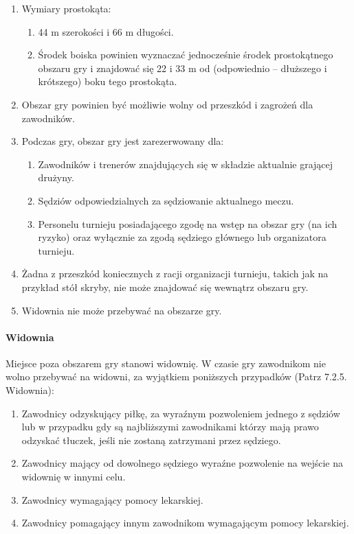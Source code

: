 \documentclass[12pt]{article}
\begin{document}
\begin{enumerate}
	\item Wymiary prostokąta:
	      \begin{enumerate}
		      \item 44 m szerokości i 66 m długości.
		      \item Środek boiska powinien wyznaczać jednocześnie środek prostokątnego
		            obszaru gry i znajdować się 22 i 33 m od (odpowiednio -- dłuższego i
		            krótszego) boku tego prostokąta.
	      \end{enumerate}

	\item Obszar gry powinien być możliwie wolny od przeszkód i zagrożeń dla
	      zawodników.

	\item Podczas gry, obszar gry jest zarezerwowany dla:
	      \begin{enumerate}
		      \item Zawodników i trenerów znajdujących się w składzie aktualnie grającej
		            drużyny.
		      \item Sędziów odpowiedzialnych za sędziowanie aktualnego meczu.
		      \item Personelu turnieju posiadającego zgodę na wstęp na obszar gry (na
		            ich ryzyko) oraz wyłącznie za zgodą sędziego głównego lub
		            organizatora turnieju.
	      \end{enumerate}

	\item Żadna z przeszkód koniecznych z racji organizacji turnieju, takich jak
	      na przykład stół skryby, nie może znajdować się wewnątrz obszaru gry.

	\item Widownia nie może przebywać na obszarze gry.
\end{enumerate}

\paragraph{Widownia}
Miejsce poza obszarem gry stanowi widownię.
W czasie gry zawodnikom nie wolno przebywać na widowni, za wyjątkiem
poniższych przypadków (Patrz 7.2.5. Widownia):

\begin{enumerate}
	\item Zawodnicy odzyskujący piłkę, za wyraźnym pozwoleniem jednego z sędziów
	      lub w przypadku gdy są najbliższymi zawodnikami którzy mają prawo
	      odzyskać tłuczek, jeśli nie zostaną zatrzymani przez sędziego.

	\item Zawodnicy mający od dowolnego sędziego wyraźne pozwolenie na wejście
	      na widownię w innymi celu.

	\item Zawodnicy wymagający pomocy lekarskiej.

	\item Zawodnicy pomagający innym zawodnikom wymagającym pomocy lekarskiej.
\end{enumerate}
\end{document}
